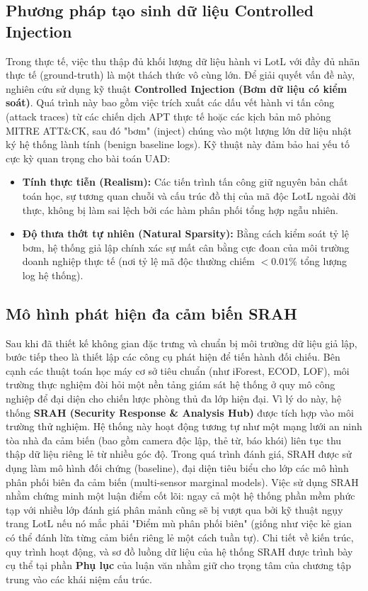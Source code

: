 \documentclass[../main.tex]{subfiles}
\begin{document}
\subsection{Phương pháp tạo sinh dữ liệu Controlled Injection}
Trong thực tế, việc thu thập đủ khối lượng dữ liệu hành vi LotL với đầy đủ nhãn thực tế (ground-truth) là một thách thức vô cùng lớn. Để giải quyết vấn đề này, nghiên cứu sử dụng kỹ thuật \textbf{Controlled Injection (Bơm dữ liệu có kiểm soát)}. Quá trình này bao gồm việc trích xuất các dấu vết hành vi tấn công (attack traces) từ các chiến dịch APT thực tế hoặc các kịch bản mô phỏng MITRE ATT\&CK, sau đó "bơm" (inject) chúng vào một lượng lớn dữ liệu nhật ký hệ thống lành tính (benign baseline logs). Kỹ thuật này đảm bảo hai yếu tố cực kỳ quan trọng cho bài toán UAD:
\begin{itemize}
    \item \textbf{Tính thực tiễn (Realism):} Các tiến trình tấn công giữ nguyên bản chất toán học, sự tương quan chuỗi và cấu trúc đồ thị của mã độc LotL ngoài đời thực, không bị làm sai lệch bởi các hàm phân phối tổng hợp ngẫu nhiên.
    \item \textbf{Độ thưa thớt tự nhiên (Natural Sparsity):} Bằng cách kiểm soát tỷ lệ bơm, hệ thống giả lập chính xác sự mất cân bằng cực đoan của môi trường doanh nghiệp thực tế (nơi tỷ lệ mã độc thường chiếm $< 0.01\%$ tổng lượng log hệ thống).
\end{itemize}

\subsection{Mô hình phát hiện đa cảm biến SRAH}
Sau khi đã thiết kế không gian đặc trưng và chuẩn bị môi trường dữ liệu giả lập, bước tiếp theo là thiết lập các công cụ phát hiện để tiến hành đối chiếu. Bên cạnh các thuật toán học máy cơ sở tiêu chuẩn (như iForest, ECOD, LOF), môi trường thực nghiệm đòi hỏi một nền tảng giám sát hệ thống ở quy mô công nghiệp để đại diện cho chiến lược phòng thủ đa lớp hiện đại. Vì lý do này, hệ thống \textbf{SRAH (Security Response \& Analysis Hub)} được tích hợp vào môi trường thử nghiệm. Hệ thống này hoạt động tương tự như một mạng lưới an ninh tòa nhà đa cảm biến (bao gồm camera độc lập, thẻ từ, báo khói) liên tục thu thập dữ liệu riêng lẻ từ nhiều góc độ. Trong quá trình đánh giá, SRAH được sử dụng làm mô hình đối chứng (baseline), đại diện tiêu biểu cho lớp các mô hình phân phối biên đa cảm biến (multi-sensor marginal models). Việc sử dụng SRAH nhằm chứng minh một luận điểm cốt lõi: ngay cả một hệ thống phần mềm phức tạp với nhiều lớp đánh giá phân mảnh cũng sẽ bị vượt qua bởi kỹ thuật ngụy trang LotL nếu nó mắc phải "Điểm mù phân phối biên" (giống như việc kẻ gian có thể đánh lừa từng cảm biến riêng lẻ một cách tuần tự). Chi tiết về kiến trúc, quy trình hoạt động, và sơ đồ luồng dữ liệu của hệ thống SRAH được trình bày cụ thể tại phần \textbf{Phụ lục} của luận văn nhằm giữ cho trọng tâm của chương tập trung vào các khái niệm cấu trúc.
\end{document}

